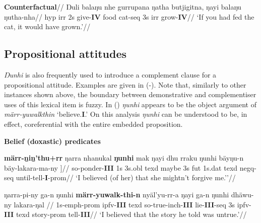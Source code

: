 \a\begingl\glpreamble\textbf{Counterfactual}//
\gla Ŋuli balaŋu nhe gurrupana ŋatha butjigitna, ŋayi balaŋu ŋutha-nha//
\glb \gls{hyp} \gls{irr} 2s give-\textbf{IV} food cat-\gls{seq}  3s \gls{irr} grow-\textbf{IV}//
\glft`If you had fed the cat, it would have grown.'\trailingcitation{[DG 20190405]}//\endgl


\xe

\subsection{Propositional attitudes}

\textit{Ŋunhi} is also frequently used to introduce a complement clause for a propositional attitude. Examples are given in (\nextx-). Note that, similarly to other instances shown above, the boundary between demonstrative and complementiser uses of this lexical item is fuzzy. In () \textit{ŋunhi} appears to be the object argument of \textit{märr-yuwalkthin} `believe.\textbf{I}.' On this analysis \textit{ŋunhi} can be understood to be, in effect, coreferential with the entire embedded proposition.

\pex \textbf{Belief (doxastic) predicates}

\a{}\begingl\gla \textbf{märr-ṉiṉ'thu+rr} ŋarra nhanukal \nogloss{[} \textbf{ŋunhi} mak ŋayi dhu rraku ŋunhi bäyŋu-n bäy-lakara-ma-ny ]//
\glb so-ponder-\textbf{III} 1s 3s.\gls{obl} \gls{texd} maybe 3s \gls{fut} 1s.\gls{dat} \gls{texd} \gls{negq}-\gls{seq} until-tell-\textbf{I}-\gls{prom}//
\glft`I believed (of her) that she mightn't forgive me.''//\endgl

\a{}\begingl\gla ŋarra-pi-ny ga-n ŋunhi \textbf{märr-yuwalk-thi-n} \nogloss{[} nyäl'yu-rr-a ŋayi ga-n ŋunhi dhäwu-ny lakara-ŋal \nogloss{]}//
\glb 1s-\gls{emph}-\gls{prom} \gls{ipfv}-\textbf{III} \gls{texd} so-true-\gls{inch}-\textbf{III} lie-\textbf{III}-\gls{seq} 3s  \gls{ipfv}-\textbf{III} \gls{texd} story-\gls{prom} tell-\textbf{III}//
\glft`I believed that the story he told was untrue.'//\endgl

